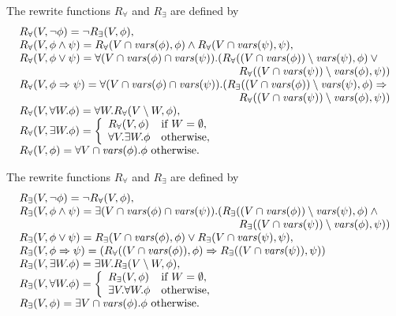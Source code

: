 The rewrite functions $R_{\forall}$ and $R_{\exists}$ are defined by
\[\begin{array}{l}
R_{\forall}(V,\neg \phi)=\neg R_{\exists}(V,\phi),\\
R_{\forall}(V,\phi\wedge \psi)=R_{\forall}(V\cap \vars(\phi),\phi)\wedge R_{\forall}(V\cap\vars(\psi),\psi),\\
R_{\forall}(V,\phi\vee\psi)=
\forall (V\cap\vars(\phi)\cap\vars(\psi)).
(R_{\forall}((V\cap \vars(\phi))\setminus \vars(\psi),\phi)\vee{}\\
\hspace*{7cm}R_{\forall}((V\cap\vars(\psi))\setminus\vars(\phi),\psi))\\
R_{\forall}(V,\phi\Rightarrow\psi)=\forall (V\cap\vars(\phi)\cap\vars(\psi)).
(R_{\exists}((V\cap \vars(\phi))\setminus \vars(\psi),\phi)\Rightarrow{} \\
\hspace*{7cm}R_{\forall}((V\cap\vars(\psi))\setminus\vars(\phi),\psi))\\
R_{\forall}(V,\forall W.\phi)=\forall W.R_{\forall}(V\setminus W,\phi),\\
R_{\forall}(V,\exists W.\phi)=
\left\{\begin{array}{ll}
R_{\forall}(V,\phi)&\textrm{if }W=\emptyset,\\
\forall V.\exists W.\phi&\textrm{otherwise},
\end{array}\right.\\
R_{\forall}(V,\phi)=\forall V\cap \vars(\phi).\phi\textrm{ otherwise}.
\end{array}
\]

The rewrite functions $R_{\forall}$ and $R_{\exists}$ are defined by
\[\begin{array}{l}
R_{\exists}(V,\neg \phi)=\neg R_{\forall}(V,\phi),\\
R_{\exists}(V,\phi\wedge\psi)=
\exists (V\cap\vars(\phi)\cap\vars(\psi)).
(R_{\exists}((V\cap \vars(\phi))\setminus \vars(\psi),\phi)\wedge{}\\
\hspace*{7cm}R_{\exists}((V\cap\vars(\psi))\setminus\vars(\phi),\psi))\\
R_{\exists}(V,\phi\vee \psi)=R_{\exists}(V\cap \vars(\phi),\phi)\vee R_{\exists}(V\cap\vars(\psi),\psi),\\
R_{\exists}(V,\phi\Rightarrow\psi)=
(R_{\forall}((V\cap \vars(\phi)),\phi)\Rightarrow
R_{\exists}((V\cap\vars(\psi)),\psi))\\
R_{\exists}(V,\exists W.\phi)=\exists W.R_{\exists}(V\setminus W,\phi),\\
R_{\exists}(V,\forall W.\phi)=
\left\{\begin{array}{ll}
R_{\exists}(V,\phi)&\textrm{if }W=\emptyset,\\
\exists V.\forall W.\phi&\textrm{otherwise},
\end{array}\right.\\
R_{\exists}(V,\phi)=\exists V\cap\vars(\phi).\phi\textrm{ otherwise}.
\end{array}
\]
\newpage
